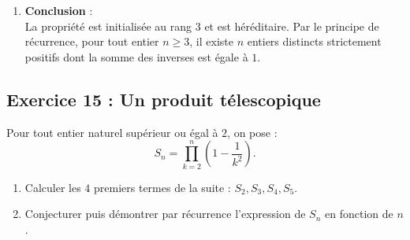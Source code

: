 \documentclass[11pt,a4paper]{article}
\begin{document}
\begin{correctionbox}
\begin{enumerate}[label=\textbf{\arabic*.}]
    \item \textbf{Conclusion} :\\
    La propriété est initialisée au rang $3$ et est héréditaire. Par le principe de récurrence, pour tout entier $n \ge 3$, il existe $n$ entiers distincts strictement positifs dont la somme des inverses est égale à $1$.
\end{enumerate}
\end{correctionbox}

\subsection*{Exercice 15 : Un produit télescopique}

Pour tout entier naturel supérieur ou égal à $2$, on pose :
\[
S_n = \prod_{k=2}^n \left(1 - \frac{1}{k^2}\right).
\]
\begin{enumerate}
    \item Calculer les $4$ premiers termes de la suite : $S_2, S_3, S_4, S_5$.
    \item Conjecturer puis démontrer par récurrence l'expression de $S_n$ en fonction de $n$.
\end{enumerate}
\end{document}
